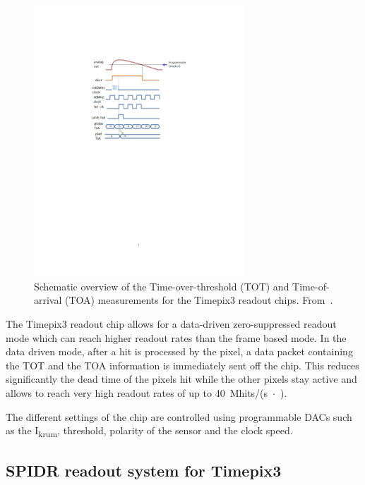 \begin{figure}[htbp]
  \centering \includegraphics[width=0.7\textwidth, trim = 50mm 140mm
    60mm 50mm, clip]{figures/Calibration/TOT_TOA_explanation.pdf}
  \caption{Schematic overview of the Time-over-threshold (TOT) and
    Time-of-arrival (TOA) measurements for the Timepix3 readout
    chips. From~\cite{Timepix3Poikela}.}
  \label{fig:TOT_TOA_concept}
\end{figure}

The Timepix3 readout chip allows for a data-driven zero-suppressed
readout mode which can reach higher readout rates than the frame based
mode. In the data driven mode, after a hit is processed by the pixel,
a data packet containing the TOT and the TOA information is
immediately sent off the chip. This reduces significantly the dead
time of the pixels hit while the other pixels stay active and allows
to reach very high readout rates of up to
40~Mhits/(s~$\cdot$~\cmsquared).

The different settings of the chip are controlled using programmable
DACs such as the I\textsubscript{krum}, threshold, polarity of the
sensor and the clock speed.



\subsection{SPIDR readout system for Timepix3}
\label{sec:TimepixReadout}

